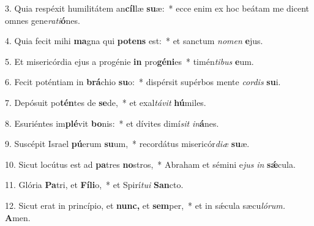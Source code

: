 \item 3. Quia respéxit humilitátem an\textbf{cíl}læ \textbf{su}æ:~* ecce enim ex hoc beátam me dicent omnes gene\textit{rati}\textbf{ó}nes.

\item 4. Quia fecit mihi \textbf{ma}gna qui \textbf{pot}\textbf{ens} est:~* et sanctum \textit{nomen} \textbf{e}jus.

\item 5. Et misericórdia ejus a progénie \textbf{in} pro\textbf{gé}\textbf{ni}es~* timén\textit{tibus} \textbf{e}um.

\item 6. Fecit poténtiam in \textbf{brá}chio \textbf{su}o:~* dispérsit supérbos mente \textit{cordis} \textbf{su}i.

\item 7. Depósuit po\textbf{tén}tes de \textbf{se}de,~* et exal\textit{távit} \textbf{hú}miles.

\item 8. Esuriéntes im\textbf{plé}vit \textbf{bo}nis:~* et dívites dimí\hspace{0.04em}\textit{sit} \textit{in}\textbf{á}nes.

\item 9. Suscépit Israel \textbf{pú}erum \textbf{su}um,~* recordátus misericór\textit{diæ} \textbf{su}æ.

\item 10. Sicut locútus est ad \textbf{pa}tres \textbf{no}stros,~* Abraham et sémini e\hspace{0.03em}\textit{jus} \textit{in} \textbf{sǽ}cula.

\item 11. Glória \textbf{Pa}tri, et \textbf{Fí}\textbf{li}o,~* et Spirí\hspace{0.03em}\textit{tui} \textbf{San}cto.

\item 12. Sicut erat in princípio, et \textbf{nunc,} et \textbf{sem}per,~* et in sǽcula sæcu\hspace{0.03em}\textit{lórum.} \textbf{A}men.


